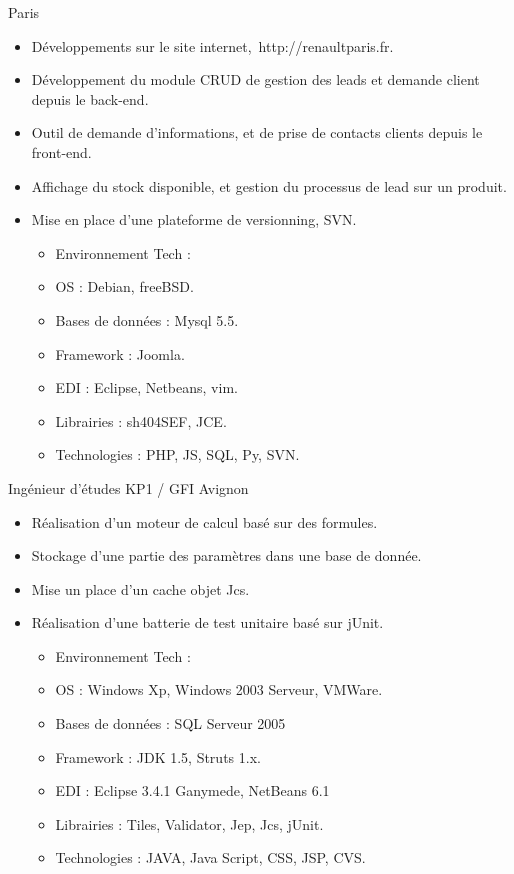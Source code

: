 \documentclass[10pt,a4paper,sans]{moderncv}
\begin{document}
{Paris}{} {
    \begin{itemize}%
        \item Développements sur le site internet, http://renaultparis.fr.
        \item Développement du module CRUD de gestion des leads et demande client depuis le back-end.
        \item Outil de demande d'informations, et de prise de contacts clients depuis le front-end.
        \item Affichage du stock disponible, et gestion du processus de lead sur un produit.
        \item Mise en place d'une plateforme de versionning, SVN.
            \begin{itemize}%
                \item Environnement Tech :
                \item OS : Debian, freeBSD.
                \item Bases de données : Mysql 5.5.
                \item Framework : Joomla.
                \item EDI : Eclipse, Netbeans, vim.
                \item Librairies : sh404SEF, JCE.
                \item Technologies : PHP, JS, SQL, Py, SVN.
            \end{itemize}
\end{itemize}}

 {Ingénieur d'études} {KP1 / GFI}
{Avignon}{} {
    \begin{itemize}%
        \item Réalisation d'un moteur de calcul basé sur des formules.
        \item Stockage d'une partie des paramètres dans une base de donnée.
        \item Mise un place d'un cache objet Jcs.
        \item Réalisation d'une batterie de test unitaire basé sur jUnit.
            \begin{itemize}%
                \item Environnement Tech :
                \item OS : Windows Xp, Windows 2003 Serveur, VMWare.
                \item Bases de données : SQL Serveur 2005
                \item Framework : JDK 1.5,  Struts 1.x.
                \item EDI : Eclipse 3.4.1 Ganymede, NetBeans 6.1
                \item Librairies : Tiles, Validator, Jep, Jcs, jUnit.
                \item Technologies : JAVA, Java Script, CSS, JSP, CVS.
            \end{itemize}
\end{itemize}}
\end{document}
